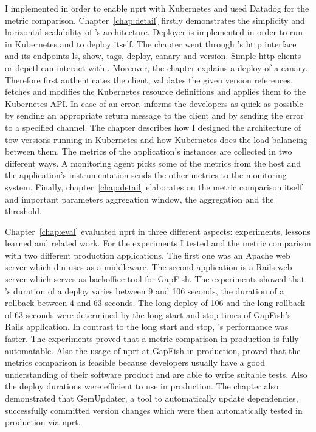 I implemented \deployer in order to enable \gls{nprt} with Kubernetes and used Datadog for
the metric comparison. Chapter~\ref{chap:detail} firstly demonstrates the simplicity and
horizontal scalability of \deployer's architecture. Deployer is implemented in order to
run in Kubernetes and to deploy itself. The chapter went through \deployer's http
interface and its endpoints ls, show, tags, deploy, canary and version. Simple http
clients or depctl can interact with \deployer. Moreover, the chapter explains a deploy of
a canary. Therefore \deployer first authenticates the client, validates the given version
references, fetches and modifies the Kubernetes resource definitions and applies them to
the Kubernetes API. In case of an error, \deployer informs the developers as quick as
possible by sending an appropriate return message to the client and by sending the error
to a specified channel. The chapter describes how I designed the architecture of tow
versions running in Kubernetes and how Kubernetes does the load balancing between
them. The metrics of the application's instances are collected in two different ways. A
monitoring agent picks some of the metrics from the host and the application's
instrumentation sends the other metrics to the monitoring system. Finally,
chapter~\ref{chap:detail} elaborates on the metric comparison itself and important
parameters aggregation window, the aggregation and the threshold.

Chapter~\ref{chap:eval} evaluated \gls{nprt} in three different aspects: experiments,
lessons learned and related work. For the experiments I tested \deployer and the metric
comparison with two different production applications. The first one was an Apache web
server which \gls{din} uses as a middleware. The second application is a Rails web server
which serves as backoffice tool for GapFish. The experiments showed that \deployer's
duration of a deploy varies between 9 and 106 seconds, the duration of a rollback between
4 and 63 seconds. The long deploy of 106 and the long rollback of 63 seconds were
determined by the long start and stop times of GapFish's Rails application. In contrast to
the long start and stop, \deployer's performance was faster. The experiments proved that a
metric comparison in production is fully automatable. Also the usage of \gls{nprt} at
GapFish in production, proved that the metrics comparison is feasible because developers
usually have a good understanding of their software product and are able to write suitable
tests. Also the deploy durations were efficient to use \deployer in production. The
chapter also demonstrated that GemUpdater, a tool to automatically update dependencies,
successfully committed version changes which were then automatically tested in production
via \gls{nprt}.


